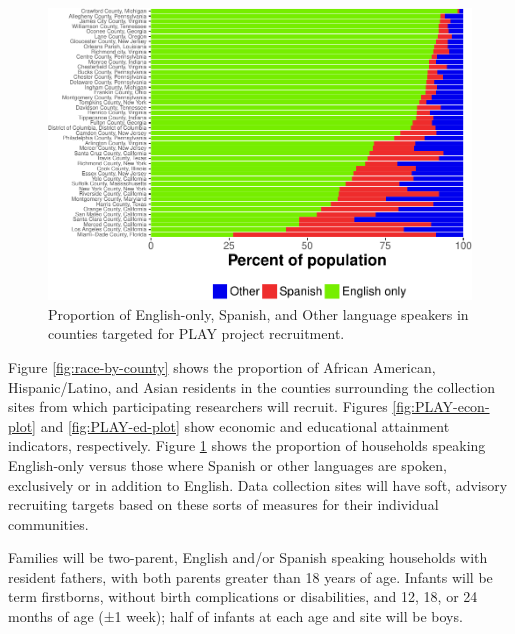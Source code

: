 \documentclass[english,man]{apa6}
\theoremstyle{definition}
\theoremstyle{definition}
\theoremstyle{definition}
\theoremstyle{remark}
\begin{document}
\begin{figure}

{\centering \includegraphics{figs/spanish-speaking-plot-1} 

}

\caption{Proportion of English-only, Spanish, and Other language speakers in counties targeted for PLAY project recruitment.}\label{fig:PLAY-spanish}
\end{figure}

Figure \ref{fig:race-by-county} shows the proportion of African
American, Hispanic/Latino, and Asian residents in the counties
surrounding the collection sites from which participating researchers
will recruit. Figures \ref{fig:PLAY-econ-plot} and
\ref{fig:PLAY-ed-plot} show economic and educational attainment
indicators, respectively. Figure \ref{fig:PLAY-spanish} shows the
proportion of households speaking English-only versus those where
Spanish or other languages are spoken, exclusively or in addition to
English. Data collection sites will have soft, advisory recruiting
targets based on these sorts of measures for their individual
communities.

Families will be two-parent, English and/or Spanish speaking households
with resident fathers, with both parents greater than 18 years of age.
Infants will be term firstborns, without birth complications or
disabilities, and 12, 18, or 24 months of age (±1 week); half of infants
at each age and site will be boys.
\end{document}
